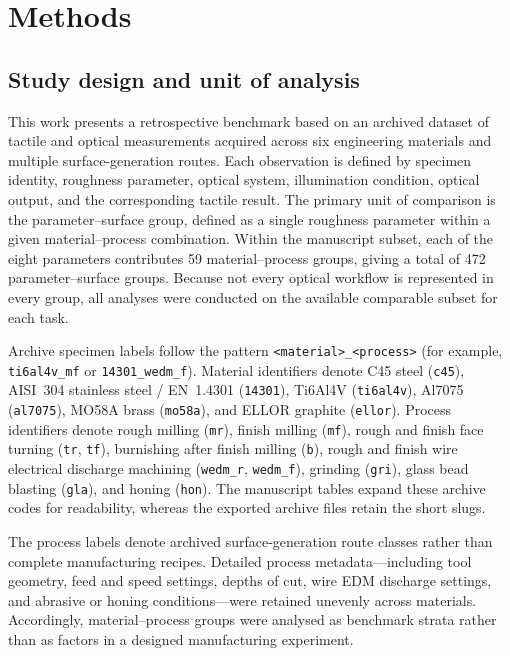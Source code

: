 \documentclass{article}
\begin{document}
\section{Methods}

\subsection{Study design and unit of analysis}
This work presents a retrospective benchmark based on an archived dataset of tactile and optical measurements acquired across six engineering materials and multiple surface-generation routes. Each observation is defined by specimen identity, roughness parameter, optical system, illumination condition, optical output, and the corresponding tactile result. The primary unit of comparison is the parameter–surface group, defined as a single roughness parameter within a given material–process combination.
Within the manuscript subset, each of the eight parameters contributes 59 material–process groups, giving a total of 472 parameter–surface groups. Because not every optical workflow is represented in every group, all analyses were conducted on the available comparable subset for each task.

Archive specimen labels follow the pattern \texttt{<material>\_<process>} (for example, \texttt{ti6al4v\_mf} or \texttt{14301\_wedm\_f}). Material identifiers denote C45 steel (\texttt{c45}), AISI~304 stainless steel / EN~1.4301 (\texttt{14301}), Ti6Al4V (\texttt{ti6al4v}), Al7075 (\texttt{al7075}), MO58A brass (\texttt{mo58a}), and ELLOR graphite (\texttt{ellor}). Process identifiers denote rough milling (\texttt{mr}), finish milling (\texttt{mf}), rough and finish face turning (\texttt{tr}, \texttt{tf}), burnishing after finish milling (\texttt{b}), rough and finish wire electrical discharge machining (\texttt{wedm\_r}, \texttt{wedm\_f}), grinding (\texttt{gri}), glass bead blasting (\texttt{gla}), and honing (\texttt{hon}). The manuscript tables expand these archive codes for readability, whereas the exported archive files retain the short slugs.

The process labels denote archived surface-generation route classes rather than complete manufacturing recipes. Detailed process metadata—including tool geometry, feed and speed settings, depths of cut, wire EDM discharge settings, and abrasive or honing conditions—were retained unevenly across materials. Accordingly, material–process groups were analysed as benchmark strata rather than as factors in a designed manufacturing experiment.
\end{document}
